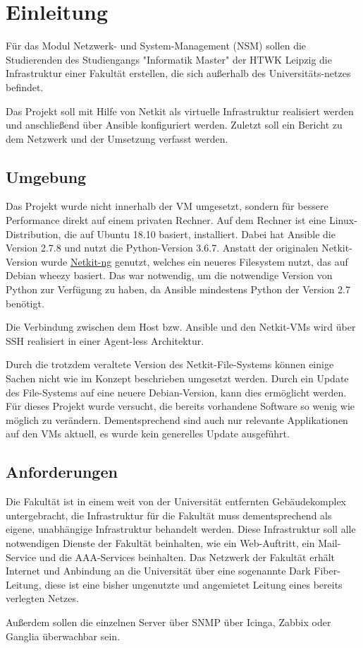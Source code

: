 \chapter{Einleitung}

Für das Modul Netzwerk- und System-Management (NSM) sollen die Studierenden des Studiengangs "Informatik Master" der HTWK Leipzig die Infrastruktur einer Fakultät erstellen, die sich außerhalb des Universitäts-netzes befindet.

Das Projekt soll mit Hilfe von Netkit als virtuelle Infrastruktur realisiert werden und anschließend über Ansible konfiguriert werden. Zuletzt soll ein Bericht zu dem Netzwerk und der Umsetzung verfasst werden.

\section{Umgebung}

Das Projekt wurde nicht innerhalb der VM umgesetzt, sondern für bessere Performance direkt auf einem privaten Rechner. Auf dem Rechner ist eine Linux-Distribution, die auf Ubuntu 18.10 basiert, installiert. Dabei hat Ansible die Version 2.7.8 und nutzt die Python-Version 3.6.7. Anstatt der originalen Netkit-Version wurde \href{https://netkit-ng.github.io/}{Netkit-ng} genutzt, welches ein neueres Filesystem nutzt, das auf Debian wheezy basiert. Das war notwendig, um die notwendige Version von Python zur Verfügung zu haben, da Ansible mindestens Python der Version 2.7 benötigt.

Die Verbindung zwischen dem Host bzw. Ansible und den Netkit-VMs wird über SSH realisiert in einer Agent-less Architektur.

Durch die trotzdem veraltete Version des Netkit-File-Systems können einige Sachen nicht wie im Konzept beschrieben umgesetzt werden. Durch ein Update des File-Systems auf eine neuere Debian-Version, kann dies ermöglicht werden. Für dieses Projekt wurde versucht, die bereits vorhandene Software so wenig wie möglich zu verändern. Dementsprechend sind auch nur relevante Applikationen auf den VMs aktuell, es wurde kein generelles Update ausgeführt.

\section{Anforderungen}
Die Fakultät ist in einem weit von der Universität entfernten Gebäudekomplex untergebracht, die Infrastruktur für die Fakultät muss dementsprechend als eigene, unabhängige Infrastruktur behandelt werden. Diese Infrastruktur soll alle notwendigen Dienste der Fakultät beinhalten, wie ein Web-Auftritt, ein Mail-Service und die AAA-Services beinhalten.
Das Netzwerk der Fakultät erhält Internet und Anbindung an die Universität über eine sogenannte Dark Fiber-Leitung, diese ist eine bisher ungenutzte und angemietet Leitung eines bereits verlegten Netzes.

Außerdem sollen die einzelnen Server über SNMP über Icinga, Zabbix oder Ganglia überwachbar sein.